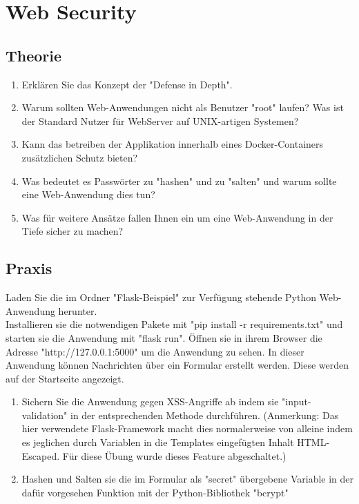 \documentclass[ngerman]{article}
\begin{document}
\section{Web Security}

\subsection{Theorie}
\begin{enumerate}
    \item Erklären Sie das Konzept der "Defense in Depth".
    \item Warum sollten Web-Anwendungen nicht als Benutzer "root" laufen? Was ist der Standard Nutzer für WebServer auf UNIX-artigen Systemen?
    \item Kann das betreiben der Applikation innerhalb eines Docker-Containers zusätzlichen Schutz bieten?
    \item Was bedeutet es Passwörter zu "hashen" und zu "salten" und warum sollte eine Web-Anwendung dies tun?
    \item Was für weitere Ansätze fallen Ihnen ein um eine Web-Anwendung in der Tiefe sicher zu machen?
\end{enumerate}

\subsection{Praxis}
Laden Sie die im Ordner "Flask-Beispiel" zur Verfügung stehende Python Web-Anwendung herunter. \\
Installieren sie die notwendigen Pakete mit "pip install -r requirements.txt" und starten sie die Anwendung mit "flask run". Öffnen sie in ihrem Browser die Adresse "http://127.0.0.1:5000" um die Anwendung zu sehen.
In dieser Anwendung können Nachrichten über ein Formular erstellt werden. Diese werden auf der Startseite angezeigt.

\begin{enumerate}
    \item Sichern Sie die Anwendung gegen XSS-Angriffe ab indem sie "input-validation" in der entsprechenden Methode durchführen. (Anmerkung: Das hier verwendete Flask-Framework macht dies normalerweise von alleine indem es jeglichen durch Variablen in die Templates eingefügten Inhalt HTML-Escaped. Für diese Übung wurde dieses Feature abgeschaltet.)
    \item Hashen und Salten sie die im Formular als "secret" übergebene Variable in der dafür vorgesehen Funktion mit der Python-Bibliothek "bcrypt"
\end{enumerate}
\end{document}
